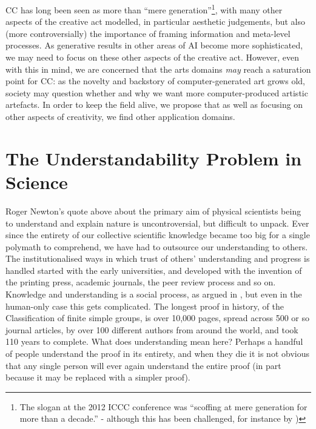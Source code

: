 \documentclass[letterpaper]{article}
\begin{document}
CC has long been seen as more than ``mere generation''\footnote{The
  slogan at the 2012 ICCC conference was ``scoffing at mere generation
  for more than a decade.'' - although this has been challenged, for
  instance by \cite{ventura})}, with many other aspects of the
creative act modelled, in particular aesthetic judgements, but also
(more controversially) the importance of framing information and
meta-level processes. As generative results in other areas of AI
become more sophisticated, we may need to focus on these other aspects
of the creative act. However, even with this in mind, we are concerned
that the arts domains {\em may} reach a saturation point for CC: as
the novelty and backstory of computer-generated art grows old, society
may question whether and why we want more computer-produced artistic
artefacts. In order to keep the field alive, we propose that as well
as focusing on other aspects of creativity, we find other application
domains.


\section{The Understandability Problem in Science}
Roger Newton's quote above about the primary aim of physical
scientists being to understand and explain nature is uncontroversial,
but difficult to unpack. Ever since the entirety of our collective
scientific knowledge became too big for a single polymath to
comprehend, we have had to outsource our understanding to others. The
institutionalised ways in which trust of others' understanding and
progress is handled started with the early universities, and developed
with the invention of the printing press, academic journals, the peer
review process and so on. Knowledge and understanding is a social
process, as argued in \cite{martin:2013}, but even in the human-only
case this gets complicated. The longest proof in history, of the
Classification of finite simple groups, is over 10,000 pages, spread
across 500 or so journal articles, by over 100 different authors from
around the world, and took 110 years to complete. What does
understanding mean here? Perhaps a handful of people understand the
proof in its entirety, and when they die it is not obvious that any
single person will ever again understand the entire proof (in part
because it may be replaced with a simpler proof).
\end{document}
